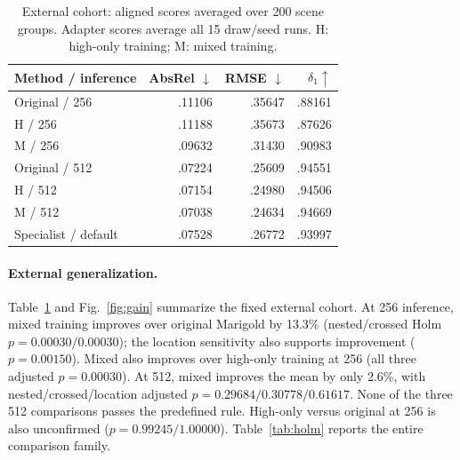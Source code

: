 \begin{table}[t]
\centering\small
\caption{External cohort: aligned scores averaged over 200 scene groups. Adapter scores average all 15 draw/seed runs. H: high-only training; M: mixed training.}
\label{tab:scores}
\begin{tabular}{lrrr}\toprule
Method / inference & AbsRel $\downarrow$ & RMSE $\downarrow$ & $\delta_1\uparrow$\\\midrule
Original / 256 & .11106 & .35647 & .88161\\
H / 256 & .11188 & .35673 & .87626\\
M / 256 & .09632 & .31430 & .90983\\\midrule
Original / 512 & .07224 & .25609 & .94551\\
H / 512 & .07154 & .24980 & .94506\\
M / 512 & .07038 & .24634 & .94669\\\midrule
Specialist / default & .07528 & .26772 & .93997\\\bottomrule
\end{tabular}
\end{table}

\paragraph{External generalization.}
Table~\ref{tab:scores} and Fig.~\ref{fig:gain} summarize the fixed external cohort. At 256 inference, mixed training improves over original Marigold by 13.3\% (nested/crossed Holm $p=0.00030/0.00030$); the location sensitivity also supports improvement ($p=0.00150$). Mixed also improves over high-only training at 256 (all three adjusted $p=0.00030$). At 512, mixed improves the mean by only 2.6\%, with nested/crossed/location adjusted $p=0.29684/0.30778/0.61617$. None of the three 512 comparisons passes the predefined rule. High-only versus original at 256 is also unconfirmed ($p=0.99245/1.00000$). Table~\ref{tab:holm} reports the entire comparison family.

